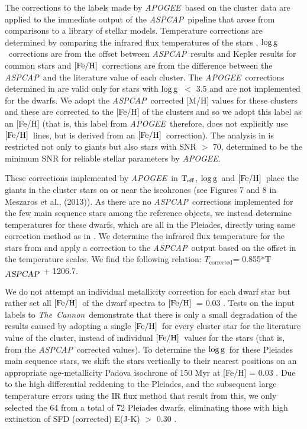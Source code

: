 \documentclass[12pt, preprint]{aastex}
\newcommand{\teff}{\mbox{$\rm T_{eff}$}}
\newcommand{\feh}{\mbox{$\rm [Fe/H]$}}
\newcommand{\logg}{\mbox{$\rm \log g$}}
\newcommand{\tc}{\textsl{The~Cannon}}
\newcommand{\apogee}{\textsl{APOGEE}}
\newcommand{\aspcap}{\textsl{ASPCAP}}
\begin{document}
The corrections to the labels made by \apogee\ based on the cluster data are applied to the immediate output of the \aspcap\ pipeline that arose from comparisons to a library of stellar models.
Temperature corrections are determined by comparing the infrared flux temperatures of the stars \citep{gonzalez2009}, \logg\ corrections are from the offset between \aspcap\ results and Kepler results for common stars and \feh\ corrections are from the difference between the \aspcap\ and  the literature value of each cluster.  
The \apogee\ corrections determined in \citet{Meszaros2013} are valid only for stars with \logg\ $<$ 3.5 and are not implemented for the dwarfs.  We adopt the \aspcap\ corrected [M/H] values for these clusters and these are corrected to the [Fe/H] of the clusters and so we adopt this label as an [Fe/H] (that is, this label from \apogee\ therefore, does not explicitly use \feh\ lines, but is derived from an \feh\ correction). 
The analysis in \citet{Meszaros2013} is restricted not only to giants but also stars with SNR $>$ 70, determined to be the minimum SNR for reliable stellar parameters by \apogee.

These corrections implemented by \apogee\ in \teff, \logg\ and  \feh\ place the giants in the cluster stars on or near the iscohrones (see Figures 7 and 8 in Meszaros et al., (2013)).  
As there are no \aspcap\ corrections implemented for the few main sequence stars among the reference objects, 
we instead determine temperatures for these dwarfs, which are all in the Pleiades, directly using same correction method 
as in \citet{Meszaros2013}. 
We determine the infrared flux temperature for the stars from \citet{gonzalez2009} and apply a correction to 
the \aspcap\ output based on the offset in the temperature scales. We find the following relation:
 $T_{\mbox{corrected}}$= 0.855*T$_{\mbox{\textit{\aspcap}}}$ + 1206.7.


We do not attempt an individual metallicity correction for each dwarf star but rather set all \feh\ of the dwarf spectra to \feh\ = 0.03 \citep{barrado2001}.
Tests on the input labels to \tc\ demonstrate that there is only a small degradation of the results caused by adopting a single \feh\ for every cluster star for the literature value of the cluster, instead of individual \feh\ values for the stars (that is, from the \aspcap\ corrected values). 
To determine the \logg\ for these Pleiades main sequence stars, we shift the stars vertically to their nearest positions on an appropriate age-metallicity Padova isochrone of 150 Myr at [Fe/H] = 0.03 \citep{girardi2000}. 
Due to the high differential reddening to the Pleiades, and the subsequent large temperature errors using the IR flux method that result from this, we only selected the 64 from a total of 72 Pleiades dwarfs, eliminating those with high extinction of SFD (corrected) E(J-K) $>$ 0.30 \citep{Schlafly2011}.
\end{document}

